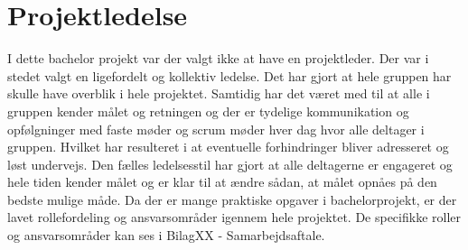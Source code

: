 % 
%
% 



 


\chapter{Projektledelse}
I dette bachelor projekt var der valgt ikke at have en projektleder. Der var i stedet valgt en ligefordelt og kollektiv ledelse. Det har gjort at hele gruppen har skulle have overblik i hele projektet. Samtidig har det været med til at alle i gruppen kender målet og retningen og der er tydelige kommunikation og opfølgninger med faste møder og scrum møder hver dag hvor alle deltager i gruppen. Hvilket har resulteret i at eventuelle forhindringer bliver adresseret og løst undervejs. Den fælles ledelsesstil har gjort at alle deltagerne er engageret og hele tiden kender målet og er klar til at ændre sådan, at målet opnåes på den bedste mulige måde. Da der er mange praktiske opgaver i bachelorprojekt, er der lavet rollefordeling og ansvarsområder igennem hele projektet. De specifikke roller og ansvarsområder kan ses i BilagXX - Samarbejdsaftale.



